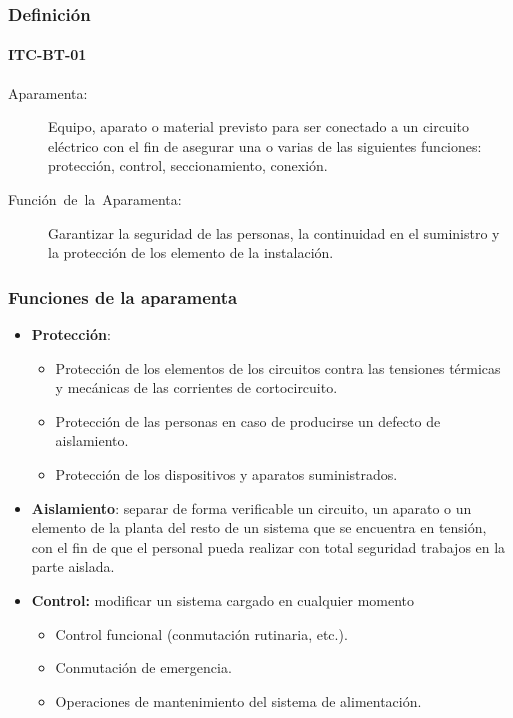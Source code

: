 \documentclass[serif, xcolor=dvipsnames]{beamer}
\begin{document}
\begin{frame}
  \frametitle{Definición}


  \framesubtitle{ITC-BT-01}
  \begin{description}
  \item [{Aparamenta:}] Equipo, aparato o material previsto para ser
    conectado a un circuito eléctrico con el fin de asegurar una o
    varias de las siguientes funciones: protección, control,
    seccionamiento, conexión.
  \item [{Función~de~la~Aparamenta:}] Garantizar la seguridad de las
    personas, la continuidad en el suministro y la protección de los
    elemento de la instalación.
  \end{description}

\end{frame}
\begin{frame}[plain]
  \frametitle{Funciones de la aparamenta}
  \begin{itemize}
  \item \textbf{Protección}:

    \begin{itemize}
    \item Protección de los elementos de los circuitos contra las
      tensiones térmicas y mecánicas de las corrientes de
      cortocircuito.
    \item Protección de las personas en caso de producirse un defecto
      de aislamiento.
    \item Protección de los dispositivos y aparatos suministrados.
    \end{itemize}
  \item \textbf{Aislamiento}: separar de forma verificable un
    circuito, un aparato o un elemento de la planta del resto de un
    sistema que se encuentra en tensión, con el fin de que el personal
    pueda realizar con total seguridad trabajos en la parte aislada.
  \item \textbf{Control:} modificar un sistema cargado en cualquier
    momento

    \begin{itemize}
    \item Control funcional (conmutación rutinaria, etc.).
    \item Conmutación de emergencia.
    \item Operaciones de mantenimiento del sistema de alimentación.
    \end{itemize}
  \end{itemize}

\end{frame}
\end{document}

